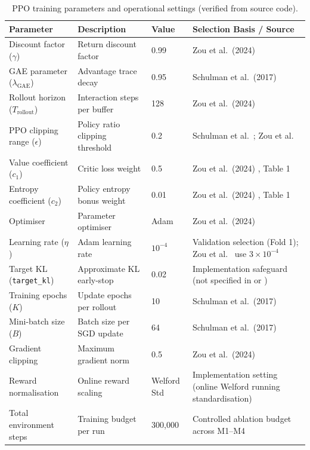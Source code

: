 \documentclass[11pt,a4paper]{article}
\numberwithin{equation}{section}
\numberwithin{table}{section}
\numberwithin{figure}{section}
\numberwithin{algorithm}{section}
\begin{document}
\begin{table}[!htbp]
\centering\small
\caption{PPO training parameters and operational settings (verified from source code).}\label{tab:ppo}
\renewcommand{\arraystretch}{1.05}\footnotesize\setlength{\tabcolsep}{4pt}
\begin{tabular}{@{}p{3.6cm}p{4.0cm}p{1.6cm}p{6.0cm}@{}}
\toprule
Parameter & Description & Value & Selection Basis / Source\\
\midrule
Discount factor ($\gamma$) & Return discount factor & 0.99 & Zou et al.\ (2024) \cite{zou2024}\\
GAE parameter ($\lambda_{\mathrm{GAE}}$) & Advantage trace decay & 0.95 & Schulman et al.\ (2017) \cite{schulman2017}\\
Rollout horizon ($T_{\mathrm{rollout}}$) & Interaction steps per buffer & 128 & Zou et al.\ (2024) \cite{zou2024}\\
PPO clipping range ($\epsilon$) & Policy ratio clipping threshold & 0.2 & Schulman et al.\ \cite{schulman2017}; Zou et al.\ \cite{zou2024}\\
Value coefficient ($c_1$) & Critic loss weight & 0.5 & Zou et al.\ (2024) \cite{zou2024}, Table 1\\
Entropy coefficient ($c_2$) & Policy entropy bonus weight & 0.01 & Zou et al.\ (2024) \cite{zou2024}, Table 1\\
Optimiser & Parameter optimiser & Adam & Zou et al.\ (2024) \cite{zou2024}\\
Learning rate ($\eta$) & Adam learning rate & $10^{-4}$ & Validation selection (Fold 1); Zou et al.\ \cite{zou2024} use $3\times10^{-4}$\\
Target KL (\texttt{target\_kl}) & Approximate KL early-stop & 0.02 & Implementation safeguard (not specified in \cite{schulman2017} or \cite{zou2024})\\
Training epochs ($K$) & Update epochs per rollout & 10 & Schulman et al.\ (2017) \cite{schulman2017}\\
Mini-batch size ($B$) & Batch size per SGD update & 64 & Schulman et al.\ (2017) \cite{schulman2017}\\
Gradient clipping & Maximum gradient norm & 0.5 & Zou et al.\ (2024) \cite{zou2024}\\
Reward normalisation & Online reward scaling & Welford Std & Implementation setting (online Welford running standardisation)\\
Total environment steps & Training budget per run & 300,000 & Controlled ablation budget across M1--M4\\

\end{tabular}
\end{table}
\end{document}
